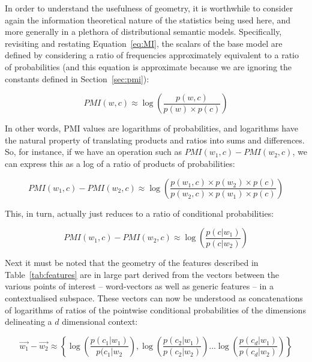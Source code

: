 In order to understand the usefulness of geometry, it is worthwhile to consider again the information theoretical nature of the statistics being used here, and more generally in a plethora of distributional semantic models.  Specifically, revisiting and restating Equation~\ref{eq:MI}, the scalars of the base model are defined by considering a ratio of frequencies approximately equivalent to a ratio of probabilities (and this equation is approximate because we are ignoring the constants defined in Section~\ref{sec:pmi}):

\begin{equation}
PMI(w,c) \approx \log\left(\frac{p(w,c)}{p(w) \times p(c)}\right)
\end{equation}

\noindent In other words, PMI values are logarithms of probabilities, and logarithms have the natural property of translating products and ratios into sums and differences.  So, for instance, if we have an operation such as $PMI(w_1,c)-PMI(w_2,c)$, we can express this as a log of a ratio of products of probabilities:

\begin{equation}
PMI(w_1,c)-PMI(w_2,c) \approx \log\left(\frac{p(w_1,c) \times p(w_2) \times p(c)}{p(w_2,c) \times p(w_1) \times p(c)} \right)
\end{equation}

\noindent This, in turn, actually just reduces to a ratio of conditional probabilities:

\begin{equation} \label{eq:logdif}
PMI(w_1,c)-PMI(w_2,c) \approx \log\left(\frac{p(c|w_1)}{p(c|w_2)}\right)
\end{equation}

\noindent Next it must be noted that the geometry of the features described in Table~\ref{tab:features} are in large part derived from the vectors between the various points of interest -- word-vectors as well as generic features -- in a contextualised subspace.  These vectors can now be understood as concatenations of logarithms of ratios of the pointwise conditional probabilities of the dimensions delineating a $d$ dimensional context:

\begin{equation}
\overrightarrow{w_1}-\overrightarrow{w_2} \approx \left\{ \log\left(\frac{p(c_1|w_1)}{p(c_1|w_2}\right), \log\left(\frac{p(c_2|w_1)}{p(c_2|w_2)}\right)... \log\left(\frac{p(c_d|w_1)}{p(c_d|w_2)}\right)\right\}
\end{equation}

